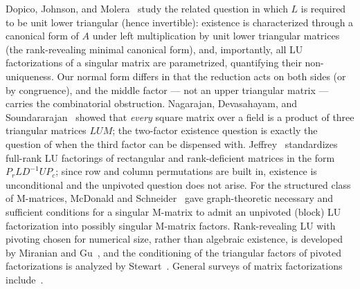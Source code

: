 Dopico, Johnson, and Molera~\cite{dopico_multiple_2006} study the related
question in which $L$ is required to be unit lower triangular (hence
invertible): existence is characterized through a canonical form of $A$
under left multiplication by unit lower triangular matrices (the
rank-revealing minimal canonical form), and, importantly, all LU
factorizations of a singular matrix are parametrized, quantifying their
non-uniqueness.  Our normal form differs in that the reduction acts on both
sides (or by congruence), and the middle factor --- not an upper triangular
matrix --- carries the combinatorial obstruction.
Nagarajan, Devasahayam, and Soundararajan~\cite{nagarajan_products_1999}
showed that \emph{every} square matrix over a field is a product of three
triangular matrices $LUM$; the two-factor existence question is exactly the
question of when the third factor can be dispensed with.
Jeffrey~\cite{jeffrey_lu_2010} standardizes full-rank LU factorings of
rectangular and rank-deficient matrices in the form $P_r L D^{-1} U P_c$;
since row and column permutations are built in, existence is unconditional
and the unpivoted question does not arise.  For the structured class of
M-matrices, McDonald and Schneider~\cite{mcdonald_schneider_1998} gave
graph-theoretic necessary and sufficient conditions for a singular M-matrix
to admit an unpivoted (block) LU factorization into possibly singular
M-matrix factors.  Rank-revealing LU with pivoting chosen for numerical
size, rather than algebraic existence, is developed by Miranian and
Gu~\cite{miranian_gu_2003}, and the conditioning of the triangular factors
of pivoted factorizations is analyzed by
Stewart~\cite{stewart_triangular_1997}.  General surveys of matrix
factorizations include~\cite{lu_numerical_2021}.

